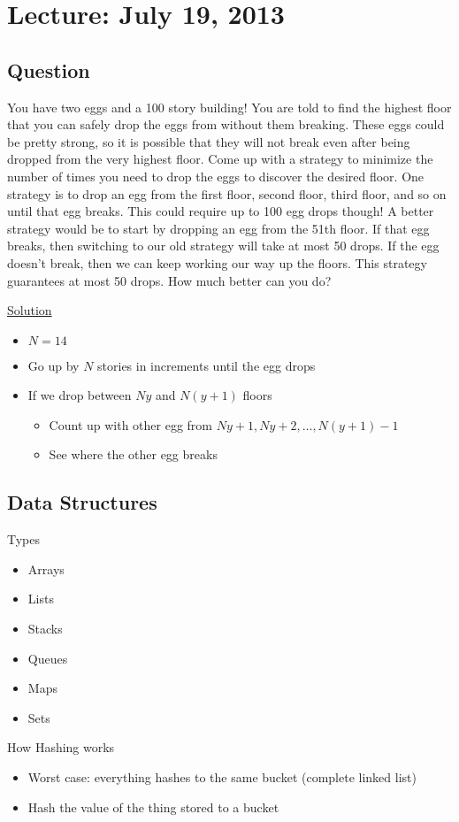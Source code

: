 
\section{Lecture: July 19, 2013}

\subsection{Question}

You have two eggs and a 100 story building! You are told to find the highest floor that you can safely drop the eggs from without them breaking. These eggs could be pretty strong, so it is possible that they will not break even after being dropped from the very highest floor. Come up with a strategy to minimize the number of times you need to drop the eggs to discover the desired floor. One strategy is to drop an egg from the first floor, second floor, third floor, and so on until that egg breaks. This could require up to 100 egg drops though! A better strategy would be to start by dropping an egg from the 51th floor. If that egg breaks, then switching to our old strategy will take at most 50 drops. If the egg doesn’t break, then we can keep working our way up the floors. This strategy guarantees at most 50 drops. How much better can you do?

\underline{Solution}

\begin{itemize}
  \item $N=14$
  \item Go up by $N$ stories in increments until the egg drops
  \item If we drop between $Ny$ and $N(y+1)$ floors
        \begin{itemize}
          \item Count up with other egg from $Ny+1, Ny+2,\ldots, N(y+1)-1$
	   \item See where the other egg breaks
        \end{itemize}
\end{itemize}

\subsection{Data Structures}

Types
\begin{itemize}
  \item Arrays
  \item Lists
  \item Stacks
  \item Queues
  \item Maps
  \item Sets
\end{itemize}

How Hashing works
\begin{itemize}
  \item Worst case: everything hashes to the same bucket (complete linked list)
  \item Hash the value of the thing stored to a bucket 
\end{itemize}















